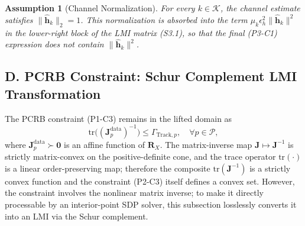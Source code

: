 \documentclass[12pt,a4paper]{article}
\newtheorem{assumption}{Assumption}
\newcommand{\vect}[1]{\mathbf{#1}}
\newcommand{\mat}[1]{\mathbf{#1}}
\newcommand{\tr}{\text{tr}}
\begin{document}
\begin{assumption}[Channel Normalization]\label{ass:channel_norm}
For every $k \in \mathcal{K}$, the channel estimate satisfies $\|\hat{\vect{h}}_k\|_2 = 1$. This normalization is absorbed into the term $\mu_k \epsilon_h^2 \|\hat{\vect{h}}_k\|^2$ in the lower-right block of the LMI matrix (S3.1), so that the final (P3-C1) expression does not contain $\|\hat{\vect{h}}_k\|^2$.
\end{assumption}

\subsection*{D. PCRB Constraint: Schur Complement LMI Transformation}

The PCRB constraint (P1-C3) remains in the lifted domain as
\begin{equation}
\tr\big((\mat{J}_p^{\text{data}})^{-1}\big) \leq \Gamma_{\text{Track},p}, \quad \forall p \in \mathcal{P}, \tag{P2-C3}
\end{equation}
where $\mat{J}_p^{\text{data}} \succ \mat{0}$ is an affine function of $\mat{R}_X$. The matrix-inverse map $\mat{J} \mapsto \mat{J}^{-1}$ is strictly matrix-convex on the positive-definite cone, and the trace operator $\tr(\cdot)$ is a linear order-preserving map; therefore the composite $\tr(\mat{J}^{-1})$ is a strictly convex function and the constraint (P2-C3) itself defines a convex set. However, the constraint involves the nonlinear matrix inverse; to make it directly processable by an interior-point SDP solver, this subsection losslessly converts it into an LMI via the Schur complement.
\end{document}
